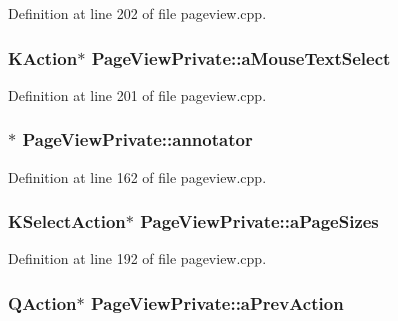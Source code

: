 Definition at line 202 of file pageview.\+cpp.

\hypertarget{classPageViewPrivate_a1d8b1716abeb281e68dce858ffda489f}{
\subsubsection[{a\+Mouse\+Text\+Select}]{\setlength{\rightskip}{0pt plus 5cm}K\+Action$\ast$ Page\+View\+Private\+::a\+Mouse\+Text\+Select}}\label{classPageViewPrivate_a1d8b1716abeb281e68dce858ffda489f}


Definition at line 201 of file pageview.\+cpp.

\hypertarget{classPageViewPrivate_a07bad73b61f6b400411aacc7e2e820a0}{
\subsubsection[{annotator}]{$\ast$ Page\+View\+Private\+::annotator}}\label{classPageViewPrivate_a07bad73b61f6b400411aacc7e2e820a0}


Definition at line 162 of file pageview.\+cpp.

\hypertarget{classPageViewPrivate_a5f864847956ada5d8933fe2d28bbc075}{
\subsubsection[{a\+Page\+Sizes}]{\setlength{\rightskip}{0pt plus 5cm}K\+Select\+Action$\ast$ Page\+View\+Private\+::a\+Page\+Sizes}}\label{classPageViewPrivate_a5f864847956ada5d8933fe2d28bbc075}


Definition at line 192 of file pageview.\+cpp.

\hypertarget{classPageViewPrivate_a63b5ccd8ed0f4ac9a89c040aeb3173a9}{
\subsubsection[{a\+Prev\+Action}]{\setlength{\rightskip}{0pt plus 5cm}Q\+Action$\ast$ Page\+View\+Private\+::a\+Prev\+Action}}\label{classPageViewPrivate_a63b5ccd8ed0f4ac9a89c040aeb3173a9}


